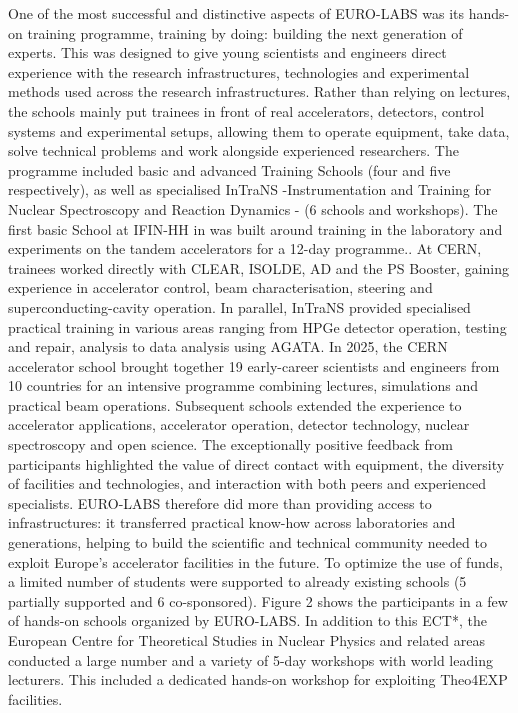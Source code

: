 \begin{itemize}
One of the most successful and distinctive aspects of EURO-LABS was its hands-on training programme, training by doing: building the next generation of experts. This was designed to give young scientists and engineers direct experience with the research infrastructures, technologies and experimental methods used across the research infrastructures. Rather than relying on lectures, the schools mainly put trainees in front of real accelerators, detectors, control systems and experimental setups, allowing them to operate equipment, take data, solve technical problems and work alongside experienced researchers. The programme included basic and advanced Training Schools (four and five respectively), as well as specialised InTraNS -Instrumentation and Training for Nuclear Spectroscopy and Reaction Dynamics -  (6 schools and workshops). The first basic School at IFIN-HH in was built around training in the laboratory and experiments on the tandem accelerators for a 12-day programme..  At CERN, trainees worked directly with CLEAR, ISOLDE, AD and the PS Booster, gaining experience in accelerator control, beam characterisation, steering and superconducting-cavity operation. In parallel, InTraNS provided specialised practical training in various areas ranging from HPGe detector operation, testing and repair, analysis to data analysis using AGATA. In 2025, the CERN accelerator school brought together 19 early-career scientists and engineers from 10 countries for an intensive programme combining lectures, simulations and practical beam operations. Subsequent schools extended the experience to accelerator applications, accelerator operation, detector technology, nuclear spectroscopy and open science. The exceptionally positive feedback from participants highlighted the value of direct contact with equipment, the diversity of facilities and technologies, and interaction with both peers and experienced specialists. EURO-LABS therefore did more than providing access to infrastructures: it transferred practical know-how across laboratories and generations, helping to build the scientific and technical community needed to exploit Europe’s accelerator facilities in the future. To optimize the use of funds, a limited number of students were supported to already existing schools (5 partially supported and 6 co-sponsored). Figure 2 shows the participants in a few of hands-on schools organized by EURO-LABS. In addition to this ECT*, the European Centre for Theoretical Studies in Nuclear Physics and related areas conducted a large number and a variety of  5-day workshops with world leading lecturers. This included a dedicated hands-on workshop for exploiting  Theo4EXP facilities.

\end{itemize}
